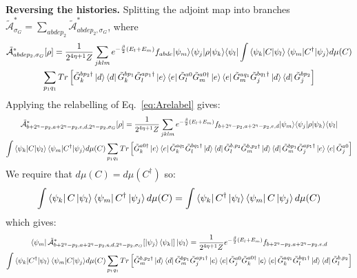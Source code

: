 \documentclass[aps,floatfix,10pt,amssymb,amsfont,amsmath,superscriptaddress,float,nofootinbib,longbibliography,nobalancelastpage,twocolumn]{revtex4-2}
\begin{document}
\smallskip
\noindent\textbf{Reversing the histories.} Splitting the adjoint map into branches $\tilde{\mathcal{A}}^*_{\sigma_G} = \sum_{abdep_2}\tilde{\mathcal{A}}^*_{abdep_2,\sigma_G}$,
where 
\begin{multline}
  \tilde{\mathcal{A}}^*_{abdep_2,\sigma_G}[\rho] = \frac{1}{2^{4\eta+1}Z} \sum_{jklm}  e^{-\frac{\beta}{2}(E_l+E_m)}{f_{abde}} {\ket{\psi_m}}{\bra{\psi_j}}\rho{\ket{\psi_k}}{\bra{\psi_l}} \int {\braket{\psi_k|C|\psi_l}\braket{\psi_m|C^{\dagger}|\psi_j}} d\mu(C)\\\sum_{p_1q_1}Tr\left[ {\tilde G^{bp_2\dagger}_k\ket{d}\bra{d}\tilde G^{bp_1}_k} {\tilde G_l^{ap_1\dagger}\ket{e}\bra{e}\tilde G_l^{a0}\tilde G_m^{a0\dagger}\ket{e}\bra{e}\tilde G_m^{aq_1}} {\tilde G^{bq_1\dagger}_j\ket{d}\bra{d}\tilde G^{bp_2}_j } \right]
\label{eq:Abranch}
\end{multline}
Applying the relabelling of Eq.~\eqref{eq:Arelabel} gives:
\begin{multline}
  \tilde{\mathcal{A}}^*_{b+2^{\eta}-p_2,a+2^{\eta}-p_2,e,d,2^{\eta}-p_2,\sigma_G}[\rho] = \frac{1}{2^{4\eta+1}Z} \sum_{jklm}  e^{-\frac{\beta}{2}(E_l+E_m)}{f_{b+2^{\eta}-p_2,a+2^{\eta}-p_2,e,d}} {\ket{\psi_m}}{\bra{\psi_j}}\rho{\ket{\psi_k}}{\bra{\psi_l}} \\\int {\braket{\psi_k|C|\psi_l}\braket{\psi_m|C^{\dagger}|\psi_j}} d\mu(C)\sum_{p_1q_1} Tr\left[{\tilde G^{a0\dagger}_k\ket{e}\bra{e}\tilde G^{aq_1}_k} {\tilde G_l^{bq_1\dagger}\ket{d}\bra{d}\tilde G_l^{b,p_2}\tilde G_m^{b, p_2\dagger}\ket{d}\bra{d}\tilde G_m^{bp_1}} {\tilde G^{ap_1\dagger}_j\ket{e}\bra{e}\tilde G^{a0}_j } \right]
\end{multline}
We require that $d\mu(C) = d\mu(C^{\dagger})$ so:
\begin{equation}
    \int  \bra{\psi_k}C\ket{\psi_{l}}\bra{\psi_m}C^{\dagger} \ket{\psi_j} d\mu(C) = \int  \bra{\psi_k}C^{\dagger}\ket{\psi_{l}}\bra{\psi_m}C \ket{\psi_j} d\mu(C)
\end{equation}
which gives:
\begin{multline}
 \bra{\psi_m}\tilde{\mathcal{A}}^*_{b+2^{\eta}-p_2,a+2^{\eta}-p_2,e,d,2^{\eta}-p_2,\sigma_G}[\ket{\psi_j}\bra{\psi_k}]\ket{\psi_l}  = \frac{1}{2^{4\eta+1}Z} e^{-\frac{\beta}{2}(E_l+E_m)}{f_{b+2^{\eta}-p_2,a+2^{\eta}-p_2,e,d}} \\\int {\braket{\psi_k|C^{\dagger}|\psi_l}\braket{\psi_m|C|\psi_j}} d\mu(C)\sum_{p_1q_1} Tr\left[ {\tilde G_m^{b, p_2\dagger}\ket{d}\bra{d}\tilde G_m^{bp_1}} {\tilde G^{ap_1\dagger}_j\ket{e}\bra{e}\tilde G^{a0}_j } \tilde G^{a0\dagger}_k\ket{e}\bra{e}\tilde G^{aq_1}_k \tilde G_l^{bq_1\dagger}\ket{d}\bra{d}\tilde G_l^{b,p_2}\right]
\label{eq:Areversed}
\end{multline}
\end{document}
